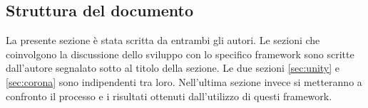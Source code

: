 		
	\subsection{Struttura del documento}
		La presente sezione è stata scritta da entrambi gli autori. Le sezioni che coinvolgono la discussione dello sviluppo con lo specifico framework sono scritte dall'autore segnalato sotto al titolo della sezione. Le due sezioni \ref{sec:unity} e \ref{sec:corona} sono indipendenti tra loro. Nell'ultima sezione invece si metteranno a confronto il processo e i risultati ottenuti dall'utilizzo di questi framework.
	
	